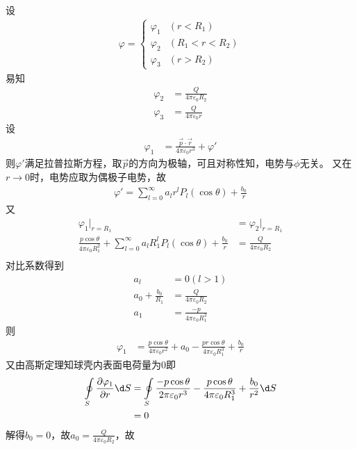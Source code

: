 \documentclass{phyasgn}
\begin{document}
\begin{sol}[4]
  设
  \begin{align*}
    \varphi=\left\{\begin{matrix}
      \varphi_1&(r<R_1)\\
      \varphi_2&(R_1<r<R_2)\\
      \varphi_3&(r>R_2)
    \end{matrix}\right.
  \end{align*}
  易知
  \begin{align*}
    \varphi_2&=\frac{Q}{4\pi\varepsilon_0R_2}\\
    \varphi_3&=\frac{Q}{4\pi\varepsilon_0r}
  \end{align*}
  设
  \begin{align*}
    \varphi_1&=\frac{\vec{p}\cdot\vec{r}}{4\pi\varepsilon_0r^3}+\varphi'
  \end{align*}
  则$\varphi'$满足拉普拉斯方程，取$\vec{p}$的方向为极轴，可且对称性知，电势与$\phi$无关。
  又在$r\to0$时，电势应取为偶极子电势，故
  \begin{align*}
    \varphi'=\sum_{l=0}^{\infty}a_lr^lP_l(\cos\theta)+\frac{b_0}{r}
  \end{align*}
  又
  \begin{align*}
    \varphi_1|_{r=R_1}&=\varphi_2|_{r=R_1}\\
    \frac{p\cos\theta}{4\pi\varepsilon_0R_1^2}+\sum_{l=0}^{\infty}a_lR_1^lP_l(\cos\theta)+\frac{b_0}{r}&=\frac{Q}{4\pi\varepsilon_0R_2}\\
  \end{align*}
  对比系数得到
  \begin{align*}
    a_l&=0(l>1)\\
    a_0+\frac{b_0}{R_1}&=\frac{Q}{4\pi\varepsilon_0R_2}\\
    a_1&=\frac{-p}{4\pi\varepsilon_0R_1^3}
  \end{align*}
  则
  \begin{align*}
    \varphi_1&=\frac{p\cos\theta}{4\pi\varepsilon_0r^2}+a_0-\frac{pr\cos\theta}{4\pi\varepsilon_0R_1^3}+\frac{b_0}{r}
  \end{align*}
  又由高斯定理知球壳内表面电荷量为0即
  \begin{align*}
    \oint\limits_{S}\frac{\partial \varphi_1}{\partial r}\d S&=\oint\limits_{S}\frac{-p\cos\theta}{2\pi\varepsilon_0r^3}-\frac{p\cos\theta}{4\pi\varepsilon_0R_1^3}+\frac{b_0}{r^2}\d S\\
    &=0
  \end{align*}
  解得$b_0=0$，故$a_0=\frac{Q}{4\pi\varepsilon_0R_2}$，故

\end{sol}
\end{document}
